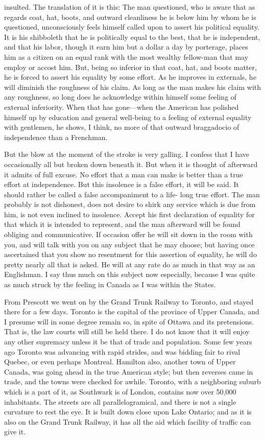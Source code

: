 insulted.  The translation of it is this: The man questioned, who
is aware that as regards coat, hat, boots, and outward cleanliness
he is below him by whom he is questioned, unconsciously feels
himself called upon to assert his political equality.  It is his
shibboleth that he is politically equal to the best, that he is
independent, and that his labor, though it earn him but a dollar a
day by porterage, places him as a citizen on an equal rank with the
most wealthy fellow-man that may employ or accost him.  But, being
so inferior in that coat, hat, and boots matter, he is forced to
assert his equality by some effort.  As he improves in externals,
he will diminish the roughness of his claim.  As long as the man
makes his claim with any roughness, so long does he acknowledge
within himself some feeling of external inferiority.  When that has
gone---when the American has polished himself up by education and
general well-being to a feeling of external equality with
gentlemen, he shows, I think, no more of that outward braggadocio
of independence than a Frenchman.

But the blow at the moment of the stroke is very galling.  I
confess that I have occasionally all but broken down beneath it.
But when it is thought of afterward it admits of full excuse.  No
effort that a man can make is better than a true effort at
independence.  But this insolence is a false effort, it will be
said.  It should rather be called a false accompaniment to a life-
long true effort.  The man probably is not dishonest, does not
desire to shirk any service which is due from him, is not even
inclined to insolence.  Accept his first declaration of equality
for that which it is intended to represent, and the man afterward
will be found obliging and communicative.  If occasion offer he
will sit down in the room with you, and will talk with you on any
subject that he may choose; but having once ascertained that you
show no resentment for this assertion of equality, he will do
pretty nearly all that is asked.  He will at any rate do as much in
that way as an Englishman.  I say thus much on this subject now
especially, because I was quite as much struck by the feeling in
Canada as I was within the States.

From Prescott we went on by the Grand Trunk Railway to Toronto, and
stayed there for a few days.  Toronto is the capital of the
province of Upper Canada, and I presume will in some degree remain
so, in spite of Ottawa and its pretensions.  That is, the law
courts will still be held there.  I do not know that it will enjoy
any other supremacy unless it be that of trade and population.
Some few years ago Toronto was advancing with rapid strides, and
was bidding fair to rival Quebec, or even perhaps Montreal.
Hamilton also, another town of Upper Canada, was going ahead in the
true American style; but then reverses came in trade, and the towns
were checked for awhile.  Toronto, with a neighboring suburb which
is a part of it, as Southwark is of London, contains now over
50,000 inhabitants.  The streets are all parallelogramical, and
there is not a single curvature to rest the eye.  It is built down
close upon Lake Ontario; and as it is also on the Grand Trunk
Railway, it has all the aid which facility of traffic can give it.

